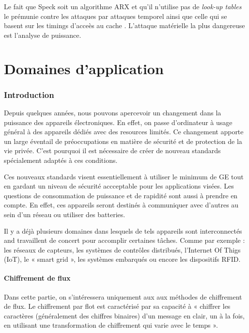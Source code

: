 			Le fait que Speck soit un algorithme ARX
			et qu'il n'utilise pas de \textit{look-up tables} le prémunie contre
			les attaques par attaques temporel ainsi que celle qui se basent sur les
			timings d'acceès au cache \cite{speck_design}. L'attaque matérielle
			la plus dangereuse est l'analyse de puissance.

\newpage
\part{Domaines d'application}

	\section{Introduction}


	Depuis quelques années, nous pouvons apercevoir un changement dans la
	puissance des appareils électroniques. En effet, on passe d'ordinateur à usage
	général à des appareils dédiés avec des resources limités. Ce changement
	apporte un large éventail de préoccupations en matière de sécurité et de
	protection de la vie privée. C'est pourquoi il est nécessaire de créer de
	nouveau standards spécialement adaptés à ces conditions.

	Ces nouveaux standards visent essentiellement à utiliser le minimum de GE tout
	en gardant un niveau de sécurité accceptable pour les applications visées. Les
	questions de consommation de puissance et de rapidité sont aussi à prendre en
	compte. En effet, ces appareils seront destinés à communiquer avec d'autres au
	sein d'un réseau ou utiliser des batteries.

	Il y a déjà plusieurs domaines dans lesquels de tels appareils sont
	interconnectés and travaillent de concert pour accomplir certaines tâches.
	Comme par exemple : les réseaux de capteurs, les systèmes de contrôles
	distribués, l'Internet Of Thigs (IoT), le « smart grid », les systèmes
	embarqués ou encore les dispositifs RFID.

	\subsection{Chiffrement de flux}

	Dans cette partie, on s'intéressera uniquement aux aux méthodes de chiffrement
	de flux. Le chiffrement par flot est caractérisé par sa capacité à « chiffrer
	les caractères (généralement des chiffres binaires) d'un message en clair, un à
	la fois, en utilisant une transformation de chiffrement qui varie avec le
	temps »\cite{appliedCrypto}.

